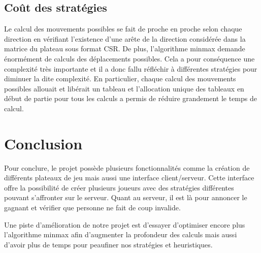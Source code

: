 \documentclass[a4paper]{article}
\begin{document}
\subsection{Coût des stratégies}
Le calcul des mouvements possibles se fait de proche en proche selon chaque direction en vérifiant l'existence d'une arête de la direction considérée dans la matrice du plateau sous format CSR. De plus, l'algorithme minmax demande énormément de calculs des déplacements possibles. Cela a pour conséquence une complexité très importante et il a donc fallu réfléchir à différentes stratégies pour diminuer la dite complexité. En particulier, chaque calcul des mouvements possibles allouait et libérait un tableau et l'allocation unique des tableaux en début de partie pour tous les calculs a permis de réduire grandement le temps de calcul.


\section{Conclusion}

Pour conclure, le projet possède plusieurs fonctionnalités comme la création de différents plateaux de jeu mais aussi une interface client/serveur. Cette interface offre la possibilité de créer plusieurs joueurs avec des stratégies différentes pouvant s'affronter sur le serveur. Quant au serveur, il est là pour annoncer le gagnant et vérifier que personne ne fait de coup invalide.

Une piste d'amélioration de notre projet est d'essayer d'optimiser encore plus l'algorithme minmax afin d'augmenter la profondeur des calculs mais aussi d'avoir plus de temps pour peaufiner nos stratégies et heuristiques.
\end{document}
